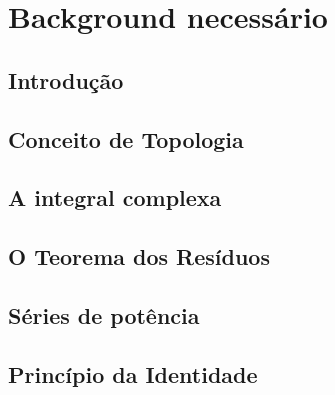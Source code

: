 \chapter{Background necessário}


\section{Introdução}

\section{Conceito de Topologia}


\section{A integral complexa}


\section{O Teorema dos Resíduos}


\section{Séries de potência}


\section{Princípio da Identidade}